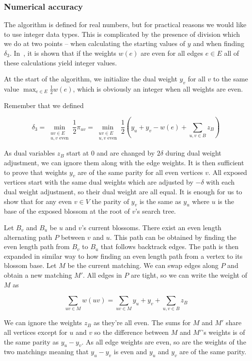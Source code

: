 \subsubsection{Numerical accuracy}

The algorithm is defined for real numbers, but for practical reasons we would like to use integer data types. This is complicated by the presence of division which we do at two points – when calculating the starting values of $y$ and when finding $\delta_3$. In~\cite{gabow1974implementation}, it is shown that if the weights $w(e)$ are even for all edges $e\in E$ all of these calculations yield integer values.

At the start of the algorithm, we initialize the dual weight $y_v$ for all $v$ to the same value $\max_{e \in E} \frac{1}{2}w(e)$, which is obviously an integer when all weights are even.

Remember that we defined

\[\delta_3=\min_{\substack{uv\in E \\ \text{$u, v$ even}}} \frac{1}{2}\pi_{uv} = \min_{\substack{uv\in E \\ \text{$u, v$ even}}} \frac{1}{2}\left(y_u + y_v - w(e) + \sum_{u, v \in B} z_B\right)\] 

As dual variables $z_B$ start at $0$ and are changed by $2\delta$ during dual weight adjustment, we can ignore them along with the edge weights. It is then sufficient to prove that weights $y_v$ are of the same parity for all even vertices $v$. All exposed vertices start with the same dual weights which are adjusted by $-\delta$ with each dual weight adjustment, so their dual weight are all equal. It is enough for us to show that for any even $v \in V$ the parity of $y_v$ is the same as $y_u$ where $u$ is the base of the exposed blossom at the root of $v$'s search tree. 

Let $B_v$ and $B_u$ be $u$ and $v$'s current blossoms. There exist an even length alternating path $P$ between $v$ and $u$. This path can be obtained by finding the even length path from $B_v$ to $B_u$ that follows backtrack edges. The path is then expanded in similar way to how finding an even length path from a vertex to its blossom base. Let $M$ be the current matching. We can swap edges along $P$ and obtain a new matching $M'$. All edges in $P$ are tight, so we can write the weight of $M$ as

\[\sum_{uv \in M} w(uv) = \sum_{uv \in M} y_u + y_v + \sum_{u, v \in B} z_B\]

We can ignore the weights $z_B$ as they're all even. The sums for $M$ and $M'$ share all vertices except for $u$ and $v$ so the difference between $M$ and $M'$'s weights is of the same parity as $y_u - y_v$. As all edge weights are even, so are the weights of the two matchings meaning that $y_u - y_v$ is even and $y_u$ and $y_v$ are of the same parity.

